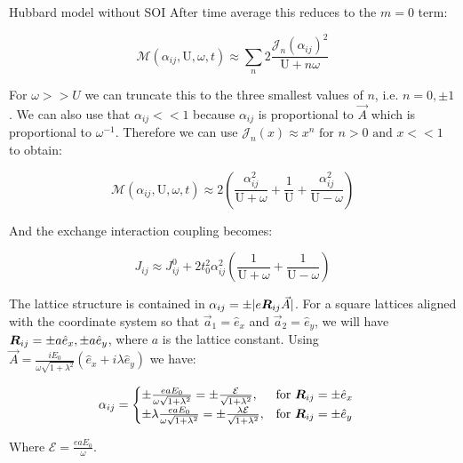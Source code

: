 \begin{section}{Hubbard model without SOI}
After time average this reduces to the $m=0$ term:

\begin{equation}
\label{MFactorApprox0}
\mathcal{M}(\alpha_{ij}, \text{U}, \omega, t) \approx \sum_{n} 2 \frac{\mathcal{J}_n(\alpha_{ij})^2}{\text{U}+n\omega}
\end{equation}

For $\omega>>U$ we can truncate this to the three smallest values of $n$, i.e. $n=0, \pm 1$. We can also use that $\alpha_{ij} << 1$ because $\alpha_{ij}$ is proportional to $\vec{A}$ which is proportional to $\omega^{-1}$. Therefore we can use $\mathcal{J}_n(x) \approx x^n \text{ for } n>0 \text{ and } x << 1$ to obtain:

\begin{equation}
\label{MFactorApprox}
\mathcal{M}(\alpha_{ij}, \text{U}, \omega, t) \approx 2 \left(\frac{\alpha_{ij}^2}{\text{U}+\omega} +\frac{1}{\text{U}} +\frac{\alpha_{ij}^2}{\text{U}-\omega} \right)
\end{equation}

And the exchange interaction coupling becomes:

\begin{equation}
\label{Jij2}
J_{ij} \approx J_{ij}^0 + 2t_0^2 \alpha_{ij}^2 \left( \frac{1}{\text{U}+\omega} + \frac{1}{\text{U}-\omega} \right)
\end{equation}

The lattice structure is contained in $\alpha_{ij} = \pm|e\boldsymbol{R}_{ij}\vec{A}|$. For a square lattices aligned with the coordinate system so that $\vec{a}_1=\hat{e}_x$ and $\vec{a}_2=\hat{e}_y$, we will have $\boldsymbol{R}_{ij} = \pm a\hat{e}_x,\pm a\hat{e}_y$, where $a$ is the lattice constant. Using $\vec{A}=\frac{iE_0}{\omega\sqrt{1+\lambda^2}}(\hat{e}_x+i\lambda\hat{e}_y)$ we have:

\begin{equation}
\alpha_{ij} = \begin{cases}
             \pm \frac{eaE_0}{\omega \sqrt{1+\lambda^2}} = \pm \frac{\mathcal{E}}{\sqrt{1+\lambda^2}},  & \text{for } \boldsymbol{R}_{ij} = \pm \hat{e}_x \\
             \pm \lambda\frac{eaE_0}{\omega \sqrt{1+\lambda^2}} = \pm \frac{\lambda \mathcal{E}}{\sqrt{1+\lambda^2}},  & \text{for } \boldsymbol{R}_{ij} = \pm \hat{e}_y
       \end{cases} \quad
\end{equation}

Where $\mathcal{E} = \frac{eaE_0}{\omega}$. 


\end{section}
